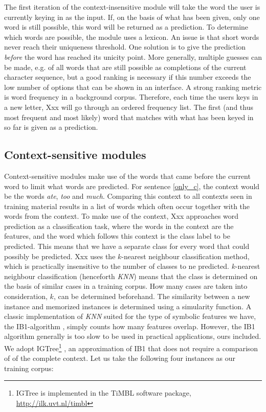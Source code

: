 \documentclass[11pt]{article}
\begin{document}
The first iteration of the context-insensitive module will take the word the user is currently keying in as the input. If, on the basis of what has been given, only one word is still possible, this word will be returned as a prediction. To determine which words are possible, the module uses a lexicon. 
An issue is that short words never reach their uniqueness threshold. One solution is to give the prediction \emph{before} the word has reached its unicity point. More generally, multiple guesses can be made, e.g. of all words that are still possible as completions of the current character sequence, but a good ranking is necessary if this number exceeds the low number of options that can be shown in an interface. A strong ranking metric is word frequency in a background corpus. Therefore, each time the users keys in a new letter, Xxx will go through an ordered frequency list. The first (and thus most frequent and most likely) word that matches with what has been keyed in so far is given as a prediction.

\subsection{Context-sensitive modules} \label{cs}

Context-sensitive modules make use of the words that came before the current word to limit what words are predicted. For sentence \ref{only_c}, the context would be the words \emph{ate}, \emph{too} and \emph{much}. Comparing this context to all contexts seen in training material results in a list of words which often occur together with the words from the context. To make use of the context, Xxx approaches word prediction as a classification task, where the words in the context are the features, and the word which follows this context is the class label to be predicted. This means that we have a separate class for every word that could possibly be predicted. Xxx uses the $k$-nearest neighbour classification method, which is practically insensitive to the number of classes to ne predicted. $k$-nearest neighbour classification (henceforth \emph{KNN}) means that the class is determined on the basis of similar cases in a training corpus. How many cases are taken into consideration, $k$, can be determined beforehand. The similarity between a new instance and memorized instances is determined using a simularity function.  A classic implementation of \emph{KNN} suited for the type of symbolic features we have, the IB1-algorithm \cite{aha+91}, simply counts how many features overlap. However, the IB1 algorithm generally is too slow to be used in practical applications, ours included. We adopt IGTree\footnote{IGTree is implemented in the TiMBL software package, \url{http://ilk.uvt.nl/timbl}} \cite{daelemans+97}, an approximation of IB1 that does not require a comparison of of the complete context. Let us take the following four instances as our training corpus:
\end{document}
